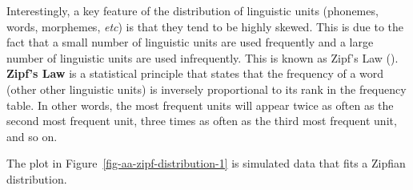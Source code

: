 \documentclass[
  letterpaper,
]{latex/krantz}
\theoremstyle{definition}
\theoremstyle{remark}
\begin{document}
Interestingly, a key feature of the distribution of linguistic units
(phonemes, words, morphemes, \emph{etc}) is that they tend to be highly
skewed. This is due to the fact that a small number of linguistic units
are used frequently and a large number of linguistic units are used
infrequently. This is known as Zipf's Law (). \textbf{Zipf's Law} is a statistical principle that states that
the frequency of a word (other other linguistic units) is inversely
proportional to its rank in the frequency table. In other words, the
most frequent units will appear twice as often as the second most
frequent unit, three times as often as the third most frequent unit, and
so on.

The plot in Figure~\ref{fig-aa-zipf-distribution-1} is simulated data
that fits a Zipfian distribution.
\end{document}

